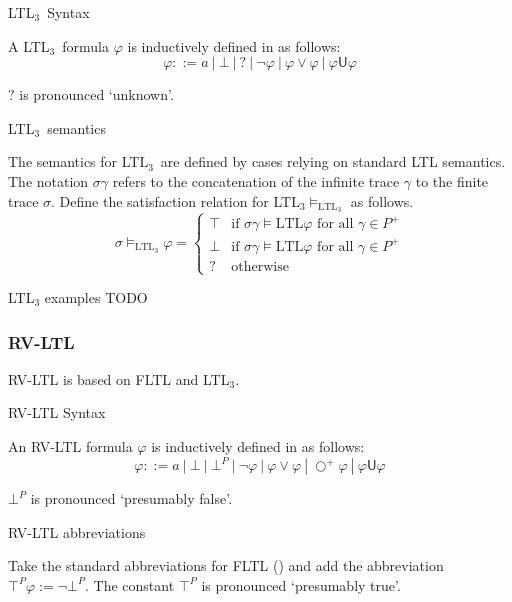 \documentclass[a4paper]{article}
\newcommand{\U}{\mathsf{U}}
\newcommand{\fall}{\text{ for all }}
\newcommand{\sn}{\bigcirc^+}
\newcommand{\ltlt}{LTL$_3$}
\begin{document}
\begin{defn}{\ltlt\ Syntax}

  A \ltlt\ formula $\varphi$ is inductively defined in as follows:
  \[\varphi ::= a ~|~ \bot ~|~ ? ~|~ \neg \varphi ~|~\varphi \lor \varphi ~|~ \varphi \U\varphi\]

  $?$ is pronounced `unknown'.
\end{defn}
\begin{defn}{\ltlt\ semantics}

  The semantics for \ltlt\ are defined by cases relying on standard LTL semantics. The notation $\sigma\gamma$ refers to the concatenation of the infinite trace $\gamma$ to the finite trace $\sigma$.
  Define the satisfaction relation for \ltlt $\vDash_{\text{\ltlt}}$ as follows.
  \[\sigma\vDash_{\text{\ltlt}}\varphi =
    \begin{cases}
      \top & \text{if } \sigma\gamma \vDash{\text{LTL}} \varphi \fall \gamma \in P^+\\
      \bot & \text{if } \sigma\gamma \vDash{\text{LTL}} \varphi \fall \gamma \in P^+\\
      ? & \text{otherwise}
    \end{cases}
    \]
\end{defn}

\begin{eg}{LTL$_3$ examples}
  TODO
\end{eg}

\subsubsection{RV-LTL} RV-LTL is based on FLTL and \ltlt.
\begin{defn}{RV-LTL Syntax}

  An RV-LTL formula $\varphi$ is inductively defined in as follows:
  \[\varphi ::= a ~|~ \bot ~|~ \bot^P ~|~ \neg \varphi ~|~\varphi \lor \varphi ~|~ \sn \varphi ~|~ \varphi \U\varphi\]

  $\bot^P$ is pronounced `presumably false'.
\end{defn}

\begin{notn}{RV-LTL abbreviations}

  Take the standard abbreviations for FLTL () and add the abbreviation $\top^P \varphi:= \neg \bot^P$. The constant $\top^P$ is pronounced `presumably true'.
\end{notn}
\end{document}
